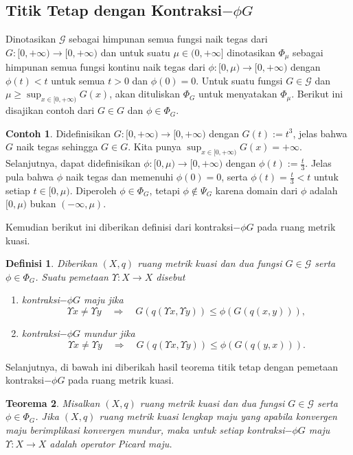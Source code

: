 \documentclass[journal]{IEEEtran}
\newtheorem{defn}{Definisi}[section]
\newtheorem{teo}[defn]{Teorema}
\theoremstyle{definition}
\newtheorem{con}{Contoh}[section]
\theoremstyle{definition}
\theoremstyle{plain}
\begin{document}
    \subsection{Titik Tetap dengan Kontraksi$-\phi G$}
    Dinotasikan $\mathcal{G}$ sebagai himpunan semua fungsi naik tegas dari $G:[0,+\infty)\rightarrow[0,+\infty)$ dan untuk suatu $\mu\in (0,+\infty]$ dinotasikan $\Phi_{\mu}$ sebagai himpunan semua fungsi kontinu naik tegas dari $\phi:[0,\mu)\rightarrow [0,+\infty)$ dengan $\phi(t)<t$ untuk semua $t>0$ dan $\phi(0)=0$. Untuk suatu fungsi $G\in \mathcal{G}$ dan $\mu\geq \sup_{x\in[0,+\infty)} G(x)$, akan dituliskan $\Phi_G$ untuk menyatakan $\Phi_{\mu}$. Berikut ini disajikan contoh dari $G\in G$ dan $\phi\in \Phi_G$.
\begin{con}
    Didefinisikan $G:[0,+\infty)\rightarrow[0,+\infty)$ dengan $G(t):=t^3$, jelas bahwa $G$ naik tegas sehingga $G\in G$. Kita punya $\sup_{x\in[0,+\infty)} G(x)=+\infty$. Selanjutnya, dapat didefinisikan $\phi:[0,\mu)\rightarrow[0,+\infty)$ dengan $\phi(t):=\frac{t}{3}$. Jelas pula bahwa $\phi$ naik tegas dan memenuhi $\phi(0)=0$, serta $\phi(t)=\frac{t}{3}<t$ untuk setiap $t\in [0,\mu)$. Diperoleh $\phi\in \Phi_G$, tetapi $\phi\notin \Psi_G$ karena domain dari $\phi$ adalah $[0,\mu)$ bukan $(-\infty,\mu)$.
\end{con}

Kemudian berikut ini diberikan definisi dari kontraksi$-\phi G$ pada ruang metrik kuasi.
\begin{defn}\label{def:KontraksiPhiG}
Diberikan $(X,q)$ ruang metrik kuasi dan dua fungsi $G\in \mathcal{G}$ serta $\phi\in\Phi_G$. Suatu pemetaan $\Upsilon: X\rightarrow X$ disebut
\begin{enumerate}
    \item[(i)] kontraksi$-\phi G$ maju jika 
    \begin{equation}
        \Upsilon x\neq \Upsilon y \quad \Longrightarrow \quad G(q(\Upsilon x,\Upsilon y)) \leq \phi (G(q(x,y))),
    \end{equation}
    \item[(ii)] kontraksi$-\phi G$ mundur jika
    \begin{equation}
        \Upsilon x \neq \Upsilon y \quad \Longrightarrow  \quad G(q(\Upsilon x, \Upsilon y)) \leq \phi (G(q(y,x))).
    \end{equation}
\end{enumerate}
\end{defn}
Selanjutnya, di bawah ini diberikah hasil teorema titik tetap dengan pemetaan kontraksi$-\phi G$ pada ruang metrik kuasi.
\begin{teo}\label{thm:phiGPicardMaju}
    Misalkan $(X,q)$ ruang metrik kuasi dan dua fungsi $G\in\mathcal{G}$ serta $\phi\in \Phi_{G}$. Jika  $(X,q)$ ruang metrik kuasi lengkap maju yang apabila konvergen maju berimplikasi konvergen mundur, maka untuk setiap kontraksi$-\phi G$ maju $\Upsilon: X\rightarrow X$ adalah operator Picard maju.
\end{teo}
\end{document}

